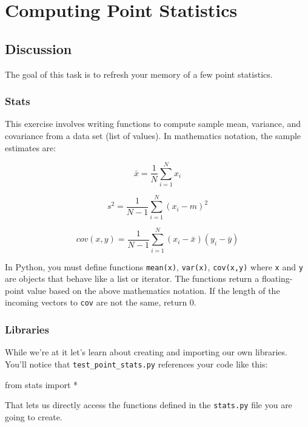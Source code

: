 \chapter{Computing Point Statistics}

\setcounter{problem}{1}
\section{Discussion}

\begin{fullwidth}

The goal of this task is to refresh your memory of a few point statistics. 

\subsection{Stats}

This exercise involves writing functions to compute sample mean, variance, and covariance from a data set (list of values).  In mathematics notation, the sample estimates are:

\[\tag{Sample mean}
\bar x = \frac{1}{N} \sum_{i=1}^{N} x_i 
\]

\[\tag{Unbiased sample variance}
s^2 = \frac{1}{N-1} \sum_{i=1}^{N} (x_i - m)^2
\]

\[\tag{Unbiased sample covariance}
cov(x,y) = \frac{1}{N-1} \sum_{i=1}^{N} (x_i - \bar x)(y_i - \bar y)
\]

In Python, you must define functions {\tt mean(x)}, {\tt var(x)}, {\tt cov(x,y)} where {\tt x} and {\tt y} are objects that behave like a list or iterator. The functions return a floating-point value based on the above mathematics notation. If the length of the incoming vectors to {\tt cov} are not the same, return 0. 

\subsection{Libraries}

While we're at it let's learn about creating and importing our own libraries.  You'll notice that {\tt test\_point\_stats.py} references your code like this:

\begin{pyverbatim}
from stats import *
\end{pyverbatim}

\noindent That lets us directly access the functions defined in the {\tt stats.py} file you are going to create.
 

\end{fullwidth}
